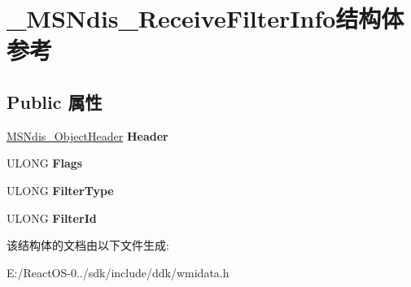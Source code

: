 \hypertarget{struct___m_s_ndis___receive_filter_info}{}\section{\+\_\+\+M\+S\+Ndis\+\_\+\+Receive\+Filter\+Info结构体 参考}
\label{struct___m_s_ndis___receive_filter_info}
\subsection*{Public 属性}
\begin{DoxyCompactItemize}
\item 
\mbox{\label{struct___m_s_ndis___receive_filter_info_a255d121a20a940945d86432635558352}} 
\hyperlink{struct___m_s_ndis___object_header}{M\+S\+Ndis\+\_\+\+Object\+Header} {\bfseries Header}
\item 
\mbox{\label{struct___m_s_ndis___receive_filter_info_a09d931fab852f1b1c5312b6bda3186e2}} 
U\+L\+O\+NG {\bfseries Flags}
\item 
\mbox{\label{struct___m_s_ndis___receive_filter_info_a97a5bdb51fdfc1597b6b4e09f42bc679}} 
U\+L\+O\+NG {\bfseries Filter\+Type}
\item 
\mbox{\label{struct___m_s_ndis___receive_filter_info_ad98c91c4b8ac154da8bc6e8f5defad4a}} 
U\+L\+O\+NG {\bfseries Filter\+Id}
\end{DoxyCompactItemize}


该结构体的文档由以下文件生成\+:\begin{DoxyCompactItemize}
\item 
E\+:/\+React\+O\+S-\/0../sdk/include/ddk/wmidata.\+h\end{DoxyCompactItemize}
